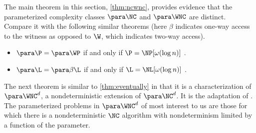 \documentclass{article}
\begin{document}
The main theorem in this section, \autoref{thm:ncwnc}, provides evidence that the parameterized complexity classes $\para \NC$ and $\para \WNC$ are distinct.
Compare it with the following similar theorems (here $\beta$ indicates one-way access to the witness as opposed to $\W$, which indicates two-way access).
\begin{itemize}
\item $\para \P = \para \WP$ if and only if $\P = \NP[\omega(\log n)]$ \autocite[Theorem~3.29]{fg06}.
\item $\para \L = \para \beta \L$ if and only if $\L = \NL[\omega(\log n)]$ \autocite[Theorem~15]{cm14}.
\end{itemize}

The next theorem is similar to \autoref{thm:eventually} in that it is a characterization of $\para \WNC^d$, a nondeterministic extension of $\para \NC^d$.
It is the adaptation of \autocite[Proposition~3.7]{fg06}.
The parameterized problems in $\para \WNC^d$ of most interest to us are those for which there is a nondeterministic $\NC$ algorithm with nondeterminism limited by a function of the parameter.
\end{document}
